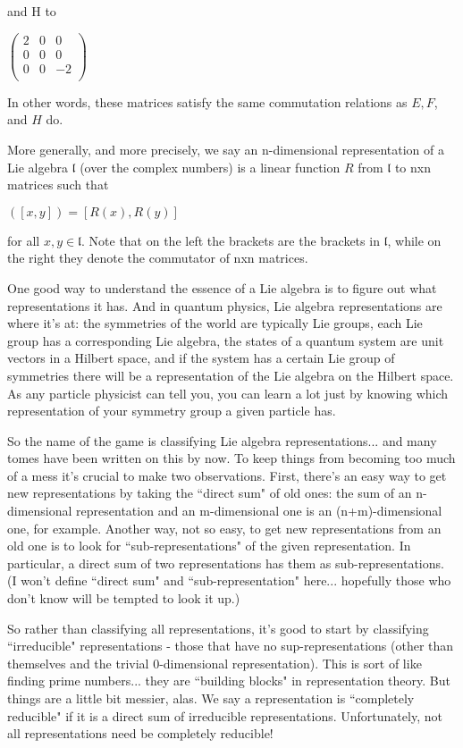 and H to

$\begin{pmatrix}
2 & 0 & 0 \\  
0 & 0 & 0 \\
0 & 0 &-2\\
\end{pmatrix}$

In other words, these matrices satisfy the same commutation relations as $E,F$, and $H$ do.

More generally, and more precisely, we say an n-dimensional representation of a Lie algebra $\mathfrak{l}$ (over the complex numbers) is a linear function $R$ from $\mathfrak{l}$ to nxn matrices such that

$([x,y]) = [R(x),R(y)]$

for all $x,y \in \mathfrak{l}$. Note that on the left the brackets are the brackets in $\mathfrak{l}$, while on the right they denote the commutator of nxn matrices.

One good way to understand the essence of a Lie algebra is to figure out what representations it has. And in quantum physics, Lie algebra representations are where it's at: the symmetries of the world are typically Lie groups, each Lie group has a corresponding Lie algebra, the states of a quantum system are unit vectors in a Hilbert space, and if the system has a certain Lie group of symmetries there will be a representation of the Lie algebra on the Hilbert space. As any particle physicist can tell you, you can learn a lot just by knowing which representation of your symmetry group a given particle has.

So the name of the game is classifying Lie algebra representations... and many tomes have been written on this by now. To keep things from becoming too much of a mess it's crucial to make two observations. First, there's an easy way to get new representations by taking the ``direct sum" of old ones: the sum of an n-dimensional representation and an m-dimensional one is an (n+m)-dimensional one, for example. Another way, not so easy, to get new representations from an old one is to look for ``sub-representations" of the given representation. In particular, a direct sum of two representations has them as sub-representations. (I won't define ``direct sum" and ``sub-representation" here... hopefully those who don't know will be tempted to look it up.)

So rather than classifying all representations, it's good to start by classifying ``irreducible" representations - those that have no sup-representations (other than themselves and the trivial 0-dimensional representation). This is sort of like finding prime numbers... they are ``building blocks" in representation theory. But things are a little bit messier, alas. We say a representation is ``completely reducible" if it is a direct sum of irreducible representations. Unfortunately, not all representations need be completely reducible!

